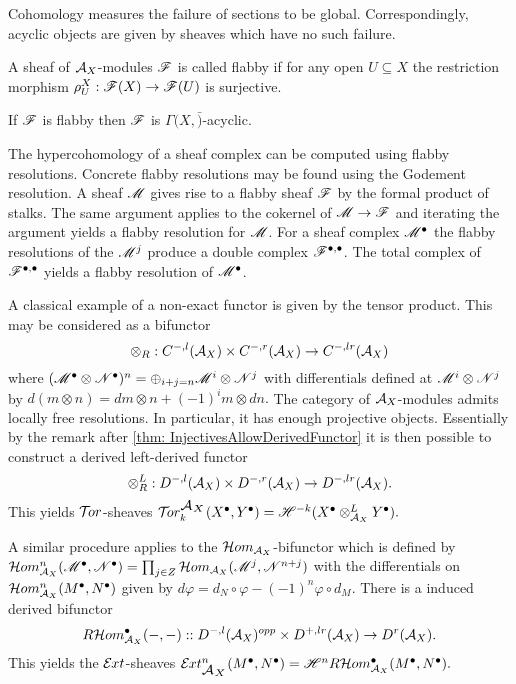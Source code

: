 Cohomology measures the failure of sections to be global.
Correspondingly, acyclic objects are given by sheaves which have no such failure.
\begin{definition}
 A sheaf of $\AA_X$-modules $\F$ is called flabby if for any open $U\subseteq X$ the restriction morphism $\rho_U^X:\F(X)\to\F(U) $ is surjective.
\end{definition}
\begin{proposition}
 If $\F$ is flabby then $\F$ is $\Gamma(X,\bar)$-acyclic.
\end{proposition}
The hypercohomology of a sheaf complex can be computed using flabby resolutions.
Concrete flabby resolutions may be found using the Godement resolution.
A sheaf $\M$ gives rise to a flabby sheaf $\F$ by the formal product of stalks.
The same argument applies to the cokernel of $\M\to \F$ and iterating the argument yields a flabby resolution for $\M$.
For a sheaf complex $\M^\bullet$ the flabby resolutions of the $\M^{j}$ produce a double complex $\F^{\bullet,\bullet}$.
The total complex of $\F^{\bullet, \bullet}$ yields a flabby resolution of $\M^\bullet$.


A classical example of a non-exact functor is given by the tensor product.
This may be considered as a bifunctor
$$ \otimes_R : C^{-,l}(\AA_X)\times C^{-,r}(\AA_X)\to C^{-,lr}(\AA_X)$$
where
$(\M^\bullet \otimes \N^\bullet)^n = \oplus_{i + j = n} \M^i \otimes \N^j $
with differentials defined at $\M^i \otimes \N^j$ by
$d(m\otimes n) = dm \otimes n + (-1)^i m \otimes dn.$
The category of $\AA_X$-modules admits locally free resolutions.
In particular, it has enough projective objects.
Essentially by the remark after \cref{thm: InjectivesAllowDerivedFunctor} it is then possible to construct a derived left-derived functor
$$ \otimes_R^L : D^{-,l}(\AA_X)\times D^{-,r}(\AA_X)\to D^{-,lr}(\AA_X).$$
This yields $\Tor$-sheaves
$\Tr{\AA_X}{k}(X^\bullet, Y^\bullet) = \H^{-k}(X^\bullet\otimes_{\AA_X}^L Y^\bullet).$

A similar procedure applies to the $\Hom_{\AA_X}$-bifunctor which is defined by
$\Hom_{\AA_X}^n(\M^\bullet, \N^\bullet) \ab = \prod_{j\in Z} \Hom_{\AA_X}(\M^j , \N^{n+j}) $
with the differentials on $\Hom_{\AA_X}^n(M^\bullet,N^\bullet)$ given by $d\varphi = d_N\circ \varphi - (-1)^n \varphi \circ d_M$.
There is a induced derived bifunctor
$$R\Hom_{\AA_X}^\bullet(\blank,\blank):: D^{-,l}(\AA_X)^{opp}\times D^{+,lr}(\AA_X)\to D^{r}(\AA_X).$$
This yields the $\Ext$-sheaves
$\Ex{\AA_X}{n}(M^\bullet,N^\bullet) = \H^n R\Hom_{\AA_X}^\bullet(M^\bullet, N^\bullet).$
